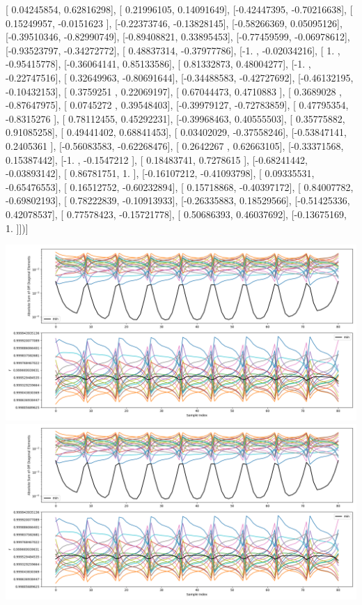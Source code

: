 \documentclass{article}
\begin{document}
       [ 0.04245854,  0.62816298],
       [ 0.21996105,  0.14091649],
       [-0.42447395, -0.70216638],
       [ 0.15249957, -0.0151623 ],
       [-0.22373746, -0.13828145],
       [-0.58266369,  0.05095126],
       [-0.39510346, -0.82990749],
       [-0.89408821,  0.33895453],
       [-0.77459599, -0.06978612],
       [-0.93523797, -0.34272772],
       [ 0.48837314, -0.37977786],
       [-1.        , -0.02034216],
       [ 1.        , -0.95415778],
       [-0.36064141,  0.85133586],
       [ 0.81332873,  0.48004277],
       [-1.        , -0.22747516],
       [ 0.32649963, -0.80691644],
       [-0.34488583, -0.42727692],
       [-0.46132195, -0.10432153],
       [ 0.3759251 ,  0.22069197],
       [ 0.67044473,  0.4710883 ],
       [ 0.3689028 , -0.87647975],
       [ 0.0745272 ,  0.39548403],
       [-0.39979127, -0.72783859],
       [ 0.47795354, -0.8315276 ],
       [ 0.78112455,  0.45292231],
       [-0.39968463,  0.40555503],
       [ 0.35775882,  0.91085258],
       [ 0.49441402,  0.68841453],
       [ 0.03402029, -0.37558246],
       [-0.53847141,  0.2405361 ],
       [-0.56083583, -0.62268476],
       [ 0.2642267 ,  0.62663105],
       [-0.33371568,  0.15387442],
       [-1.        , -0.1547212 ],
       [ 0.18483741,  0.7278615 ],
       [-0.68241442, -0.03893142],
       [ 0.86781751,  1.        ],
       [-0.16107212, -0.41093798],
       [ 0.09335531, -0.65476553],
       [ 0.16512752, -0.60232894],
       [ 0.15718868, -0.40397172],
       [ 0.84007782, -0.69802193],
       [ 0.78222839, -0.10913933],
       [-0.26335883,  0.18529566],
       [-0.51425336,  0.42078537],
       [ 0.77578423, -0.15721778],
       [ 0.50686393,  0.46037692],
       [-0.13675169,  1.        ]])]
\begin{center}
\includegraphics[scale=.9]{report_pickled_controls228/control_dpn_all.png}
\includegraphics[scale=.9]{report_pickled_controls228/control_dpn_all.png}

\end{center}
\end{document}
